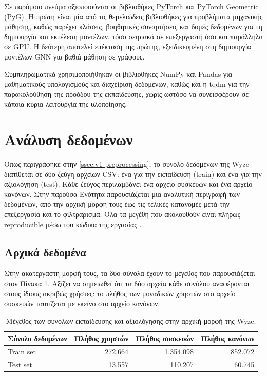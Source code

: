 Σε παρόμοιο πνεύμα αξιοποιούνται οι βιβλιοθήκες PyTorch και PyTorch Geometric (PyG). Η πρώτη είναι μία από τις θεμελιώδεις βιβλιοθήκες για προβλήματα μηχανικής μάθησης, καθώς παρέχει κλάσεις, βοηθητικές συναρτήσεις και δομές δεδομένων για τη δημιουργία και εκτέλεση μοντέλων, τόσο σειριακά σε επεξεργαστή όσο και παράλληλα σε GPU. Η δεύτερη αποτελεί επέκταση της πρώτης, εξειδικευμένη στη δημιουργία μοντέλων GNN για βαθιά μάθηση σε γράφους.

Συμπληρωματικά χρησιμοποιήθηκαν οι βιβλιοθήκες NumPy \cite{harris_array_2020, numpy_software} και Pandas \cite{mckinney_data_2010, pandas_software} για μαθηματικούς υπολογισμούς και διαχείριση δεδομένων, καθώς και η tqdm \cite{tqdm_software} για την παρακολούθηση της προόδου της εκπαίδευσης, χωρίς ωστόσο να συνεισφέρουν σε κάποια κύρια λειτουργία της υλοποίησης.

\section{Ανάλυση δεδομένων}\label{sec:exp-data}
Όπως περιγράφηκε στην \autoref{ssec:v1-preprocessing}, το σύνολο δεδομένων της Wyze διατίθεται σε δύο ζεύγη αρχείων CSV: ένα για την εκπαίδευση (train) και ένα για την αξιολόγηση (test). Κάθε ζεύγος περιλαμβάνει ένα αρχείο συσκευών και ένα αρχείο κανόνων. Στην παρούσα Ενότητα παρουσιάζεται μια αναλυτική περιγραφή των δεδομένων, από την αρχική μορφή τους έως τις τελικές κατανομές μετά την επεξεργασία και το φιλτράρισμα. Όλα τα μεγέθη που ακολουθούν είναι πλήρως reproducible μέσω του κώδικα της εργασίας \cite{politis_code_2026}.

\subsection{Αρχικά δεδομένα}\label{ssec:data-raw}
Στην ακατέργαστη μορφή τους, τα δύο σύνολα έχουν το μέγεθος που παρουσιάζεται στον Πίνακα \ref{tab:raw-data}. Αξίζει να σημειωθεί ότι τα δύο αρχεία κάθε συνόλου αναφέρονται στους ίδιους ακριβώς χρήστες: το πλήθος των μοναδικών χρηστών στο αρχείο συσκευών ταυτίζεται με εκείνο στο αρχείο κανόνων.

\begin{table}[htbp]
  \centering
  \begin{tabular}{l r r r}
    \toprule
    Σύνολο δεδομένων & Πλήθος χρηστών & Πλήθος συσκευών & Πλήθος κανόνων \\
    \midrule
    Train set & 272.664 & 1.354.098 & 852.072 \\
    Test set  & 13.557  & 110.207   & 60.745  \\
    \bottomrule
  \end{tabular}
  \caption[Μέγεθος ακατέργαστων δεδομένων]{Μέγεθος των συνόλων εκπαίδευσης και αξιολόγησης στην αρχική μορφή της Wyze.}
  \label{tab:raw-data}
\end{table}

